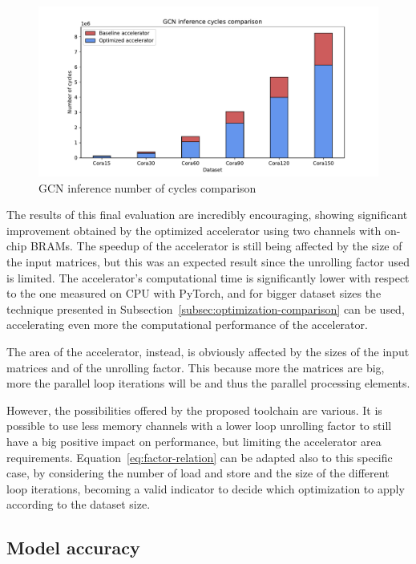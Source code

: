 \begin{figure}[t!]
    \centering
    \includegraphics[height=0.4\textwidth]{Images/gcn_forward_cycles_comparison}
    \caption{GCN inference number of cycles comparison}
    \label{fig:gcn-inference-cycles-comparison}
\end{figure}

The results of this final evaluation are incredibly encouraging, showing significant improvement obtained by the optimized accelerator using two channels with on-chip BRAMs.
The speedup of the accelerator is still being affected by the size of the input matrices, but this was an expected result since the unrolling factor used is limited.
The accelerator's computational time is significantly lower with respect to the one measured on CPU with PyTorch, and for bigger dataset sizes the technique presented in Subsection~\ref{subsec:optimization-comparison} can be used, accelerating even more the computational performance of the accelerator.

The area of the accelerator, instead, is obviously affected by the sizes of the input matrices and of the unrolling factor.
This because more the matrices are big, more the parallel loop iterations will be and thus the parallel processing elements.

However, the possibilities offered by the proposed toolchain are various.
It is possible to use less memory channels with a lower loop unrolling factor to still have a big positive impact on performance, but limiting the accelerator area requirements.
Equation~\ref{eq:factor-relation} can be adapted also to this specific case, by considering the number of load and store and the size of the different loop iterations, becoming a valid indicator to decide which optimization to apply according to the dataset size.

\subsection{Model accuracy}
\label{subsec:modeol-accuracy}%

